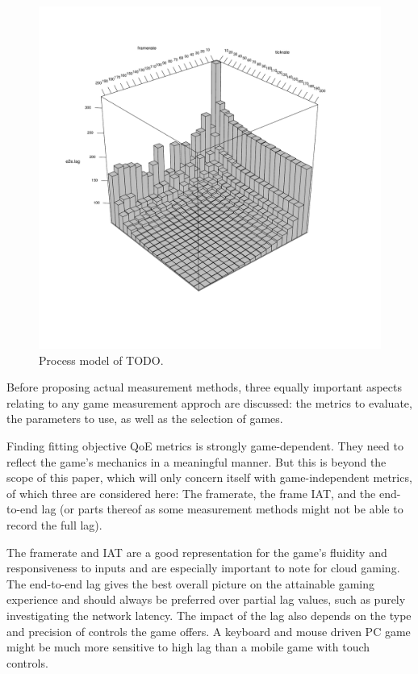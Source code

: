 \begin{figure}[!t]
	\centering
	\includegraphics[width=1.0\columnwidth]{../simulation/visualization/e2e-lag-3dbars.pdf}
	\caption{Process model of TODO.}
\label{fig:3dbars-framerate-tickrate-lag}
\end{figure}

Before proposing actual measurement methods, three equally important aspects relating to any game measurement approch are discussed: the metrics to evaluate, the parameters to use, as well as the selection of games. 

Finding fitting objective \gls{QoE} metrics is strongly game-dependent. They need to reflect the game's mechanics in a meaningful manner. But this is beyond the scope of this paper, which will only concern itself with game-independent metrics, of which three are considered here: The framerate, the frame \gls{IAT}, and the end-to-end lag (or parts thereof as some measurement methods might not be able to record the full lag).

The framerate and \gls{IAT} are a good representation for the game's fluidity and responsiveness to inputs and are especially important to note for cloud gaming. The end-to-end lag gives the best overall picture on the attainable gaming experience and should always be preferred over partial lag values, such as purely investigating the network latency. The impact of the lag also depends on the type and precision of controls the game offers. A keyboard and mouse driven PC game might be much more sensitive to high lag than a mobile game with touch controls.

